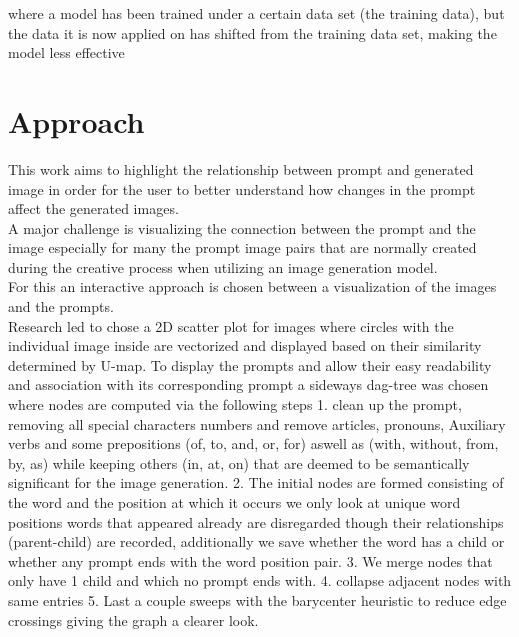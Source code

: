 \documentclass[
  a4paper,  %
  twoside,  %
  bibliography=totoc,
  headsepline,
  cleardoublepage=empty,
  parskip=half,
  draft=false
]{scrbook}
\begin{document}
where a model has been trained under a certain data set (the training data), but the data it is now applied on has shifted from the training data set, making the model less effective 
\chapter{Approach}
This work aims to highlight the relationship between prompt and generated image in order for the user to better understand how changes in the prompt affect the generated images. \\
A major challenge is visualizing the connection between the prompt and the image especially for many the prompt image pairs that are normally created during the creative process when utilizing an image generation model.\\
For this an interactive approach is chosen  between a visualization of the images and the prompts.\\ Research led to chose a 2D scatter plot for images where circles with the individual image inside are vectorized and  displayed based on their similarity determined by U-map. To display the prompts and allow their easy readability and association with its corresponding prompt a sideways dag-tree was chosen where nodes are computed via the following steps 1. clean up the prompt, removing all special characters numbers and remove articles, pronouns, Auxiliary verbs and some prepositions (of, to, and, or, for) aswell as (with, without, from, by, as) while keeping others (in, at, on) that are deemed to be semantically significant for the image generation. 2. The initial nodes are formed consisting of the word and the position at which it occurs we only look at unique word positions words that appeared already are disregarded though their relationships (parent-child) are recorded, additionally we save whether the word has a child or whether any prompt ends with the word position pair. 3. We merge nodes that only have 1 child and which no prompt ends with. 4. collapse adjacent nodes with same entries 5. Last a couple sweeps with the barycenter heuristic to reduce edge crossings giving the graph a clearer look.\\
\end{document}
